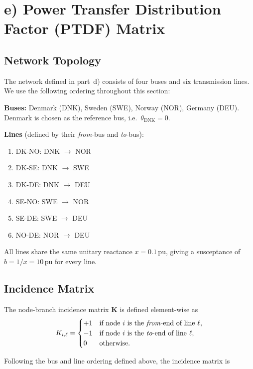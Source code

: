 \section{e) Power Transfer Distribution Factor (PTDF) Matrix}

\subsection*{Network Topology}

The network defined in part~d) consists of four buses and six transmission lines. We use the following ordering throughout this section:

\textbf{Buses:} Denmark (DNK), Sweden (SWE), Norway (NOR), Germany (DEU). Denmark is chosen as the reference bus, i.e.\ $\theta_\text{DNK} = 0$.

\textbf{Lines} (defined by their \emph{from}-bus and \emph{to}-bus):
\begin{enumerate}
    \item DK-NO: DNK $\to$ NOR
    \item DK-SE: DNK $\to$ SWE
    \item DK-DE: DNK $\to$ DEU
    \item SE-NO: SWE $\to$ NOR
    \item SE-DE: SWE $\to$ DEU
    \item NO-DE: NOR $\to$ DEU
\end{enumerate}

All lines share the same unitary reactance $x = 0.1$\,pu, giving a susceptance of $b = 1/x = 10$\,pu for every line.

\subsection*{Incidence Matrix}

The node-branch incidence matrix $\mathbf{K}$ is defined element-wise as
\begin{equation}
    K_{i,\ell} =
    \begin{cases}
        +1 & \text{if node } i \text{ is the \emph{from}-end of line } \ell, \\
        -1 & \text{if node } i \text{ is the \emph{to}-end of line } \ell, \\
         0 & \text{otherwise.}
    \end{cases}
\end{equation}

Following the bus and line ordering defined above, the incidence matrix is

